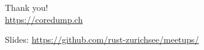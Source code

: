 \documentclass[aspectratio=1610,14pt,t]{beamer}
\begin{document}

{
\begin{frame}[standout]
  \begin{centering}
    {\Huge Thank you!}\\
    {\normalsize \url{https://coredump.ch}}\\
  \end{centering}
  {\small Slides: \url{https://github.com/rust-zurichsee/meetups/}}\\
  \vspace{3cm}
\end{frame}
}
\end{document}
